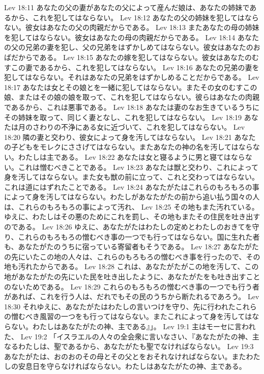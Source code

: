 Lev 18:11  あなたの父の妻があなたの父によって産んだ娘は、あなたの姉妹であるから、これを犯してはならない。
Lev 18:12  あなたの父の姉妹を犯してはならない。彼女はあなたの父の肉親だからである。
Lev 18:13  またあなたの母の姉妹を犯してはならない。彼女はあなたの母の肉親だからである。
Lev 18:14  あなたの父の兄弟の妻を犯し、父の兄弟をはずかしめてはならない。彼女はあなたのおばだからである。
Lev 18:15  あなたの嫁を犯してはならない。彼女はあなたのむすこの妻であるから、これを犯してはならない。
Lev 18:16  あなたの兄弟の妻を犯してはならない。それはあなたの兄弟をはずかしめることだからである。
Lev 18:17  あなたは女とその娘とを一緒に犯してはならない。またその女のむすこの娘、またはその娘の娘を取って、これを犯してはならない。彼らはあなたの肉親であるから、これは悪事である。
Lev 18:18  あなたは妻のなお生きているうちにその姉妹を取って、同じく妻となし、これを犯してはならない。
Lev 18:19  あなたは月のさわりの不浄にある女に近づいて、これを犯してはならない。
Lev 18:20  隣の妻と交わり、彼女によって身を汚してはならない。
Lev 18:21  あなたの子どもをモレクにささげてはならない。またあなたの神の名を汚してはならない。わたしは主である。
Lev 18:22  あなたは女と寝るように男と寝てはならない。これは憎むべきことである。
Lev 18:23  あなたは獣と交わり、これによって身を汚してはならない。また女も獣の前に立って、これと交わってはならない。これは道にはずれたことである。
Lev 18:24  あなたがたはこれらのもろもろの事によって身を汚してはならない。わたしがあなたがたの前から追い払う国々の人は、これらのもろもろの事によって汚れ、
Lev 18:25  その地もまた汚れている。ゆえに、わたしはその悪のためにこれを罰し、その地もまたその住民を吐き出すのである。
Lev 18:26  ゆえに、あなたがたはわたしの定めとわたしのおきてを守り、これらのもろもろの憎むべき事の一つでも行ってはならない。国に生れた者も、あなたがたのうちに宿っている寄留者もそうである。
Lev 18:27  あなたがたの先にいたこの地の人々は、これらのもろもろの憎むべき事を行ったので、その地も汚れたからである。
Lev 18:28  これは、あなたがたがこの地を汚して、この地があなたがたの先にいた民を吐き出したように、あなたがたをも吐き出すことのないためである。
Lev 18:29  これらのもろもろの憎むべき事の一つでも行う者があれば、これを行う人は、だれでもその民のうちから断たれるであろう。
Lev 18:30  それゆえに、あなたがたはわたしの言いつけを守り、先に行われたこれらの憎むべき風習の一つをも行ってはならない。またこれによって身を汚してはならない。わたしはあなたがたの神、主である』」。
Lev 19:1  主はモーセに言われた、
Lev 19:2  「イスラエルの人々の全会衆に言いなさい、『あなたがたの神、主なるわたしは、聖であるから、あなたがたも聖でなければならない。
Lev 19:3  あなたがたは、おのおのその母とその父とをおそれなければならない。またわたしの安息日を守らなければならない。わたしはあなたがたの神、主である。
